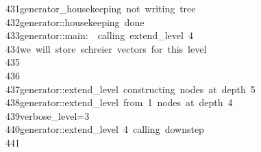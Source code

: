 \begin{tabbing}
431\>generator\_housekeeping\ not\ writing\ tree\\[0pt]
432\>generator::housekeeping\ done\\[0pt]
433\>generator::main:\ \ calling\ extend\_level\ 4\\[0pt]
434\>we\ will\ store\ schreier\ vectors\ for\ this\ level\\[0pt]
435\>\\[0pt]
436\>\\[0pt]
437\>generator::extend\_level\ constructing\ nodes\ at\ depth\ 5\\[0pt]
438\>generator::extend\_level\ from\ 1\ nodes\ at\ depth\ 4\\[0pt]
439\>verbose\_level=3\\[0pt]
440\>generator::extend\_level\ 4\ calling\ downstep\\[0pt]
441\>\\[0pt]

\end{tabbing}
